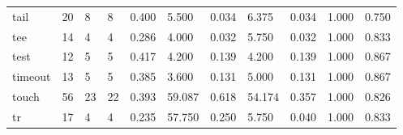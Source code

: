 \begin{longtable}{lp{1.8cm}p{1.8cm}p{1.8cm}p{1.8cm}p{1.8cm}p{1.8cm}p{1.8cm}p{1.8cm}p{1.8cm}p{1.8cm}}
tail      &                           20 &                  8 &                                 8 &                                      0.400 &                                  5.500 &                                        0.034 &                             6.375 &                                   0.034 &                              1.000 &                                              0.750 \\
tee       &                           14 &                  4 &                                 4 &                                      0.286 &                                  4.000 &                                        0.032 &                             5.750 &                                   0.032 &                              1.000 &                                              0.833 \\
test      &                           12 &                  5 &                                 5 &                                      0.417 &                                  4.200 &                                        0.139 &                             4.200 &                                   0.139 &                              1.000 &                                              0.867 \\
timeout   &                           13 &                  5 &                                 5 &                                      0.385 &                                  3.600 &                                        0.131 &                             5.000 &                                   0.131 &                              1.000 &                                              0.867 \\
touch     &                           56 &                 23 &                                22 &                                      0.393 &                                 59.087 &                                        0.618 &                            54.174 &                                   0.357 &                              1.000 &                                              0.826 \\
tr        &                           17 &                  4 &                                 4 &                                      0.235 &                                 57.750 &                                        0.250 &                             5.750 &                                   0.040 &                              1.000 &                                              0.833 \\

\end{longtable}
